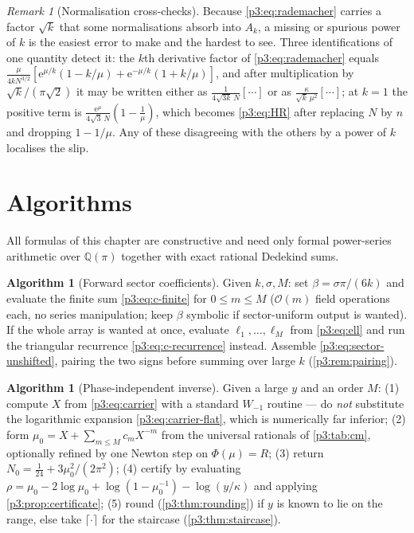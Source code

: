 \documentclass[11pt,a4paper,oneside]{book}
\theoremstyle{plain}
\theoremstyle{definition}
\newtheorem{algorithm}[theorem]{Algorithm}
\theoremstyle{remark}
\newtheorem{remark}[theorem]{Remark}
\newcommand{\Rat}{\mathbb{Q}}
\newcommand{\e}{\mathrm{e}}
\newcommand{\bigO}{\mathcal{O}}
\newcommand{\Wlam}{W}
\begin{document}
\begin{remark}[Normalisation cross-checks]\label{p3:sub:normalization-crosscheck}
Because \cref{p3:eq:rademacher} carries a factor $\sqrt k$ that some normalisations absorb into
$A_{k}$, a missing or spurious power of $k$ is the easiest error to make and the hardest to see.
Three identifications of one quantity detect it: the $k$th derivative factor of
\cref{p3:eq:rademacher} equals $\frac{\mu}{4kN^{3/2}}[\e^{\mu/k}(1-k/\mu)+\e^{-\mu/k}(1+k/\mu)]$,
and after multiplication by $\sqrt k/(\pi\sqrt2)$ it may be written either as
$\frac1{4\sqrt{3k}\,N}[\cdots]$ or as $\frac{\kappa}{\sqrt k\,\mu^{2}}[\cdots]$; at $k=1$ the
positive term is $\frac{\e^{\mu}}{4\sqrt3\,N}(1-\tfrac1\mu)$, which becomes \cref{p3:eq:HR} after
replacing $N$ by $n$ and dropping $1-1/\mu$. Any of these disagreeing with the others by a power
of $k$ localises the slip.
\end{remark}

\section{Algorithms}\label{p3:sec:algorithms}

All formulas of this chapter are constructive and need only formal power-series arithmetic over
$\Rat(\pi)$ together with exact rational Dedekind sums.

\begin{algorithm}[Forward sector coefficients]\label{p3:alg:forward}
Given $k,\sigma,M$: set $\beta=\sigma\pi/(6k)$ and evaluate the finite sum \cref{p3:eq:c-finite}
for $0\le m\le M$ ($\bigO(m)$ field operations each, no series manipulation; keep $\beta$
symbolic if sector-uniform output is wanted). If the whole array is wanted at once, evaluate
$\ell_{1},\dots,\ell_{M}$ from \cref{p3:eq:ell} and run the triangular recurrence
\cref{p3:eq:c-recurrence} instead. Assemble \cref{p3:eq:sector-unshifted}, pairing the two signs
before summing over large $k$ (\cref{p3:rem:pairing}).
\end{algorithm}

\begin{algorithm}[Phase-independent inverse]\label{p3:alg:core}
Given a large $y$ and an order $M$: (1) compute $X$ from \cref{p3:eq:carrier} with a standard
$\Wlam_{-1}$ routine --- do \emph{not} substitute the logarithmic expansion
\cref{p3:eq:carrier-flat}, which is numerically far inferior; (2) form $\mu_{0}=X+\sum_{m\le
M}c_{m}X^{-m}$ from the universal rationals of \cref{p3:tab:cm}, optionally refined by one Newton
step on $\Phi(\mu)=R$; (3) return $N_{0}=\tfrac1{24}+3\mu_{0}^{2}/(2\pi^{2})$; (4) certify by
evaluating $\rho=\mu_{0}-2\log\mu_{0}+\log(1-\mu_{0}^{-1})-\log(y/\kappa)$ and applying
\cref{p3:prop:certificate}; (5) round (\cref{p3:thm:rounding}) if $y$ is known to lie on the
range, else take $\lceil\cdot\rceil$ for the staircase (\cref{p3:thm:staircase}).
\end{algorithm}
\end{document}
